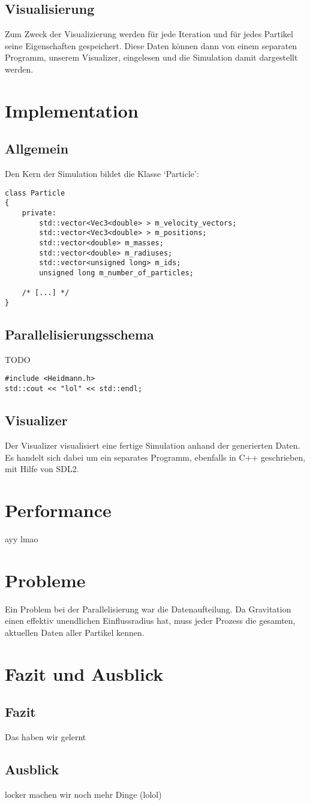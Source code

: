 \subsection{Visualisierung}
Zum Zweck der Visualizierung werden für jede Iteration und für jedes Partikel seine
Eigenschaften gespeichert. Diese Daten können dann von einem separaten Programm,
unserem Visualizer, eingelesen und die Simulation damit dargestellt werden.


\section{Implementation}
\subsection{Allgemein}
Den Kern der Simulation bildet die Klasse `Particle':
\begin{verbatim}
class Particle
{
    private:
        std::vector<Vec3<double> > m_velocity_vectors;
        std::vector<Vec3<double> > m_positions;
        std::vector<double> m_masses;
        std::vector<double> m_radiuses;
        std::vector<unsigned long> m_ids;
        unsigned long m_number_of_particles;

    /* [...] */
}
\end{verbatim}

\subsection{Parallelisierungsschema}
TODO

\begin{verbatim}
#include <Heidmann.h>
std::cout << "lol" << std::endl;
\end{verbatim}


\subsection{Visualizer}
Der Visualizer visualisiert eine fertige Simulation anhand der generierten Daten.
Es handelt sich dabei um ein separates Programm, ebenfalls in C++ geschrieben,
mit Hilfe von SDL2.

\section{Performance}
ayy lmao

\section{Probleme}
Ein Problem bei der Parallelisierung war die Datenaufteilung. Da Gravitation einen effektiv
unendlichen Einflussradius hat, muss jeder Prozess die gesamten, aktuellen Daten aller
Partikel kennen.

\section{Fazit und Ausblick}
\subsection{Fazit}
Das haben wir gelernt
\subsection{Ausblick}
locker machen wir noch mehr Dinge (lolol)

